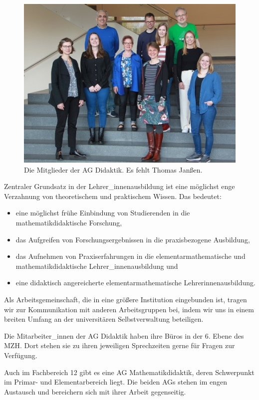 \documentclass[
  bibliography=totoc,
  oneside,
  12pt,
  a4paper]{scrbook}
\begin{document}
\begin{figure}
\centering
\includegraphics{bild_ag.jpg}
\caption{\label{fig:ID}Die Mitglieder der AG Didaktik. Es fehlt Thomas Janßen.}
\end{figure}

Zentraler Grundsatz in der Lehrer\_innenausbildung ist eine möglichst
enge Verzahnung von theoretischem und praktischem Wissen. Das bedeutet:

\begin{itemize}
\item
  eine möglichst frühe Einbindung von Studierenden in die
  mathematikdidaktische Forschung,
\item
  das Aufgreifen von Forschungsergebnissen in die praxisbezogene
  Ausbildung,
\item
  das Aufnehmen von Praxiserfahrungen in die elementarmathematische
  und mathematikdidaktische Lehrer\_innenausbildung und
\item
  eine didaktisch angereicherte
  elementarmathematische Lehrerinnenausbildung.
\end{itemize}

Als Arbeitsgemeinschaft, die in eine größere Institution eingebunden
ist, tragen wir zur Kommunikation mit anderen Arbeitsgruppen bei, indem
wir uns in einem breiten Umfang an der universitären Selbstverwaltung
beteiligen.

Die Mitarbeiter\_innen der AG Didaktik haben ihre Büros in der 6. Ebene
des MZH. Dort stehen sie zu ihren jeweiligen Sprechzeiten gerne für
Fragen zur Verfügung.

Auch im Fachbereich 12 gibt es eine AG Mathematikdidaktik, deren
Schwerpunkt im Primar- und Elementarbereich liegt. Die beiden AGs stehen
im engen Austausch und bereichern sich mit ihrer Arbeit gegenseitig.
\end{document}
